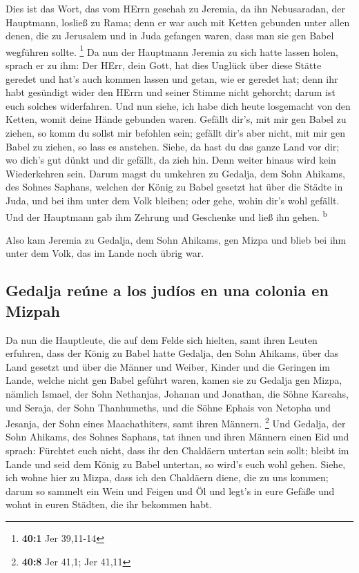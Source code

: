  Dies ist das Wort, das vom HErrn geschah zu Jeremia, da
ihn Nebusaradan, der Hauptmann, losließ zu Rama; denn er war auch mit
Ketten gebunden unter allen denen, die zu Jerusalem und in Juda gefangen
waren, dass man sie gen Babel wegführen sollte. \footnote{\textbf{40:1}
  Jer 39,11-14}  Da nun der Hauptmann Jeremia zu sich
hatte lassen holen, sprach er zu ihm: Der HErr, dein Gott, hat dies
Unglück über diese Stätte geredet  und hat's auch kommen
lassen und getan, wie er geredet hat; denn ihr habt gesündigt wider den
HErrn und seiner Stimme nicht gehorcht; darum ist euch solches
widerfahren.  Und nun siehe, ich habe dich heute
losgemacht von den Ketten, womit deine Hände gebunden waren. Gefällt
dir's, mit mir gen Babel zu ziehen, so komm du sollst mir befohlen sein;
gefällt dir's aber nicht, mit mir gen Babel zu ziehen, so lass es
anstehen. Siehe, da hast du das ganze Land vor dir; wo dich's gut dünkt
und dir gefällt, da zieh hin.  Denn weiter hinaus wird
kein Wiederkehren sein. Darum magst du umkehren zu Gedalja, dem Sohn
Ahikams, des Sohnes Saphans, welchen der König zu Babel gesetzt hat über
die Städte in Juda, und bei ihm unter dem Volk bleiben; oder gehe, wohin
dir's wohl gefällt. Und der Hauptmann gab ihm Zehrung und Geschenke und
ließ ihn gehen. \textsuperscript{b}

 Also kam Jeremia zu Gedalja, dem Sohn Ahikams, gen Mizpa
und blieb bei ihm unter dem Volk, das im Lande noch übrig war.

\hypertarget{gedalja-reuxfane-a-los-juduxedos-en-una-colonia-en-mizpah}{%
\subsection{Gedalja reúne a los judíos en una colonia en
Mizpah}\label{gedalja-reuxfane-a-los-juduxedos-en-una-colonia-en-mizpah}}

 Da nun die Hauptleute, die auf dem Felde sich hielten,
samt ihren Leuten erfuhren, dass der König zu Babel hatte Gedalja, den
Sohn Ahikams, über das Land gesetzt und über die Männer und Weiber,
Kinder und die Geringen im Lande, welche nicht gen Babel geführt waren,
 kamen sie zu Gedalja gen Mizpa, nämlich Ismael, der Sohn
Nethanjas, Johanan und Jonathan, die Söhne Kareahs, und Seraja, der Sohn
Thanhumeths, und die Söhne Ephais von Netopha und Jesanja, der Sohn
eines Maachathiters, samt ihren Männern. \footnote{\textbf{40:8} Jer
  41,1; Jer 41,11}  Und Gedalja, der Sohn Ahikams, des
Sohnes Saphans, tat ihnen und ihren Männern einen Eid und sprach:
Fürchtet euch nicht, dass ihr den Chaldäern untertan sein sollt; bleibt
im Lande und seid dem König zu Babel untertan, so wird's euch wohl
gehen.  Siehe, ich wohne hier zu Mizpa, dass ich den
Chaldäern diene, die zu uns kommen; darum so sammelt ein Wein und Feigen
und Öl und legt's in eure Gefäße und wohnt in euren Städten, die ihr
bekommen habt.

